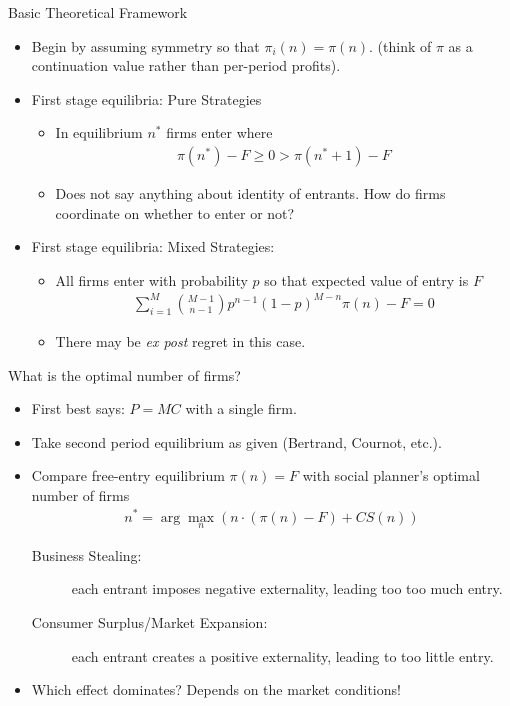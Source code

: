 \documentclass[aspectratio=169,11pt]{beamer}
\begin{document}
\begin{frame}{Basic Theoretical Framework}
\begin{itemize}
\item Begin by assuming symmetry so that $\pi_i(n) = \pi(n)$. (think of $\pi$ as a continuation value rather than per-period profits).
\item First stage equilibria: Pure Strategies
\begin{itemize}
\item In equilibrium $n^*$ firms enter where 
\begin{eqnarray*}
\pi(n^*)  - F \geq 0 > \pi(n^* +1) -F
\end{eqnarray*}
\item Does not say anything about identity of entrants. How do firms coordinate on whether to enter or not?
\end{itemize}
\item First stage equilibria: Mixed Strategies:
\begin{itemize}
\item All firms enter with probability $p$ so that expected value of entry is $F$
\begin{eqnarray*}
\sum_{i=1}^M {{M-1}\choose{n-1}} p^{n-1} (1-p)^{M-n} \pi(n) - F = 0
\end{eqnarray*}
\item There may be \textit{ex post} regret in this case.
\end{itemize}
\end{itemize}
\end{frame} 

\begin{frame}{What is the optimal number of firms?}
\begin{itemize}
\item First best says: $P=MC$ with a single firm.
\item Take second period equilibrium as given (Bertrand, Cournot, etc.).
\item Compare free-entry equilibrium $\pi(n) =F$ with social planner's optimal number of firms
\begin{eqnarray*}
n^* = \arg \max_n \left (n \cdot (\pi(n) - F)  + CS(n) \right)
\end{eqnarray*}
\begin{description}
\item[Business Stealing:] each entrant imposes \alert{negative} externality, leading too too much entry.
\item[Consumer Surplus/Market Expansion:] each entrant creates a \alert{positive} externality, leading to too little entry.
\end{description}
\item Which effect dominates? Depends on the market conditions!
\end{itemize}
\end{frame} 
\end{document}
